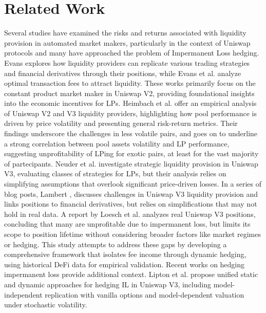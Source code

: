 \documentclass{article}
\begin{document}
\section{Related Work}
Several studies have examined the risks and returns associated with liquidity provision in automated market makers, particularly in the context of Uniswap protocols and many have approached the problem of Impermanent Loss hedging.\newline
Evans \cite{evans2020} explores how liquidity providers can replicate various trading strategies and financial derivatives through their positions, while Evans et al. \cite{evans2021} analyze optimal transaction fees to attract liquidity. These works primarily focus on the constant product market maker in Uniswap V2, providing foundational insights into the economic incentives for LPs.\newline
Heimbach et al. \cite{heimbach2022} offer an empirical analysis of Uniswap V2 and V3 liquidity providers, highlighting how pool performance is driven by price volatility and presenting general risk-return metrics. Their findings underscore the challenges in less volatile pairs, and goes on to underline a strong correlation between pool assets volatility and LP performance, suggesting unprofitability of LPing for exotic pairs, at least for the vast majority of partecipants.\newline
Neuder et al. \cite{neuder2021} investigate strategic liquidity provision in Uniswap V3, evaluating classes of strategies for LPs, but their analysis relies on simplifying assumptions that overlook significant price-driven losses. \newline
In a series of blog posts, Lambert \cite{lambert2021_optimal_liquidity}, \cite{
lambert2021_pricing_lp} discusses challenges in Uniswap V3 liquidity provision and links positions to financial derivatives, but relies on simplifications that may not hold in real data.\newline
A report by Loesch et al. \cite{loesch2021} analyzes real Uniswap V3 positions, concluding that many are unprofitable due to impermanent loss, but limits its scope to position lifetime without considering broader factors like market regimes or hedging. \newline
This study attempts to address these gaps by developing a comprehensive framework that isolates fee income through dynamic hedging, using historical DeFi data for empirical validation.\newline
Recent works on hedging impermanent loss provide additional context. Lipton et al. \cite{lipton2024} propose unified static and dynamic approaches for hedging IL in Uniswap V3, including model-independent replication with vanilla options and model-dependent valuation under stochastic volatility.
\end{document}
